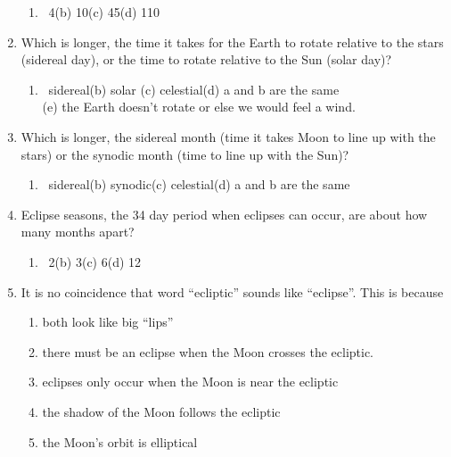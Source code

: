 \documentclass[12pt,thmsa]{article}
\begin{document}
\begin{enumerate}
\begin{enumerate}
\item  \ 4\qquad (b) 10\qquad (c) 45\qquad (d) 110\qquad
\end{enumerate}

\item  Which is longer, the time it takes for the Earth to rotate
relative to the stars (sidereal day), or the time to rotate relative
to the Sun (solar day)?
\begin{enumerate}
\item  \ sidereal\qquad (b) solar \qquad (c) celestial\qquad (d) a and b
are the same \\
(e) the Earth doesn't rotate or else we would feel a wind.
\end{enumerate}

\item  Which is longer, the sidereal month (time it takes Moon to line up
with the stars) or the synodic month (time to line up with the Sun)?

\begin{enumerate}
\item  \ sidereal\qquad (b) synodic\qquad (c) celestial\qquad (d) a and b
are the same\qquad
\end{enumerate}

\item  Eclipse seasons, the 34 day period when eclipses can occur, are about
how many months apart?

\begin{enumerate}
\item  \ 2\qquad (b) 3\qquad (c) 6\qquad (d) 12\qquad
\end{enumerate}

\item  It is no coincidence that word ``ecliptic'' sounds like ``eclipse''.
This is because

\begin{enumerate}
\item  both look like big ``lips''
\item  there must be an eclipse when the Moon crosses the ecliptic.
\item  eclipses only occur when the Moon is near the ecliptic
\item  the shadow of the Moon follows the ecliptic
\item  the Moon's orbit is elliptical
\end{enumerate}


\end{enumerate}
\end{document}
